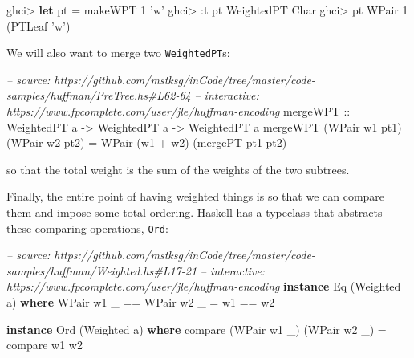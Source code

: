\documentclass[]{article}
\newenvironment{Shaded}{}{}
\newcommand{\KeywordTok}[1]{\textcolor[rgb]{0.00,0.44,0.13}{\textbf{{#1}}}}
\newcommand{\DataTypeTok}[1]{\textcolor[rgb]{0.56,0.13,0.00}{{#1}}}
\newcommand{\DecValTok}[1]{\textcolor[rgb]{0.25,0.63,0.44}{{#1}}}
\newcommand{\CharTok}[1]{\textcolor[rgb]{0.25,0.44,0.63}{{#1}}}
\newcommand{\CommentTok}[1]{\textcolor[rgb]{0.38,0.63,0.69}{\textit{{#1}}}}
\newcommand{\OtherTok}[1]{\textcolor[rgb]{0.00,0.44,0.13}{{#1}}}
\newcommand{\FunctionTok}[1]{\textcolor[rgb]{0.02,0.16,0.49}{{#1}}}
\newcommand{\NormalTok}[1]{{#1}}
\begin{document}
\begin{Shaded}
\begin{Highlighting}[]
\NormalTok{ghci}\FunctionTok{>} \KeywordTok{let} \NormalTok{pt }\FunctionTok{=} \NormalTok{makeWPT }\DecValTok{1} \CharTok{'w'}
\NormalTok{ghci}\FunctionTok{>} \FunctionTok{:}\NormalTok{t pt}
\DataTypeTok{WeightedPT} \DataTypeTok{Char}
\NormalTok{ghci}\FunctionTok{>} \NormalTok{pt}
\DataTypeTok{WPair} \DecValTok{1} \NormalTok{(}\DataTypeTok{PTLeaf} \CharTok{'w'}\NormalTok{)}
\end{Highlighting}
\end{Shaded}

We will also want to merge two \texttt{WeightedPT}s:

\begin{Shaded}
\begin{Highlighting}[]
\CommentTok{-- source: https://github.com/mstksg/inCode/tree/master/code-samples/huffman/PreTree.hs#L62-64}
\CommentTok{-- interactive: https://www.fpcomplete.com/user/jle/huffman-encoding}
\OtherTok{mergeWPT ::} \DataTypeTok{WeightedPT} \NormalTok{a }\OtherTok{->} \DataTypeTok{WeightedPT} \NormalTok{a }\OtherTok{->} \DataTypeTok{WeightedPT} \NormalTok{a}
\NormalTok{mergeWPT (}\DataTypeTok{WPair} \NormalTok{w1 pt1) (}\DataTypeTok{WPair} \NormalTok{w2 pt2)}
    \FunctionTok{=} \DataTypeTok{WPair} \NormalTok{(w1 }\FunctionTok{+} \NormalTok{w2) (mergePT pt1 pt2)}
\end{Highlighting}
\end{Shaded}

so that the total weight is the sum of the weights of the two subtrees.

Finally, the entire point of having weighted things is so that we can
compare them and impose some total ordering. Haskell has a typeclass
that abstracts these comparing operations, \texttt{Ord}:

\begin{Shaded}
\begin{Highlighting}[]
\CommentTok{-- source: https://github.com/mstksg/inCode/tree/master/code-samples/huffman/Weighted.hs#L17-21}
\CommentTok{-- interactive: https://www.fpcomplete.com/user/jle/huffman-encoding}
\KeywordTok{instance} \DataTypeTok{Eq} \NormalTok{(}\DataTypeTok{Weighted} \NormalTok{a) }\KeywordTok{where}
    \DataTypeTok{WPair} \NormalTok{w1 _ }\FunctionTok{==} \DataTypeTok{WPair} \NormalTok{w2 _ }\FunctionTok{=} \NormalTok{w1 }\FunctionTok{==} \NormalTok{w2}

\KeywordTok{instance} \DataTypeTok{Ord} \NormalTok{(}\DataTypeTok{Weighted} \NormalTok{a) }\KeywordTok{where}
    \NormalTok{compare (}\DataTypeTok{WPair} \NormalTok{w1 _) (}\DataTypeTok{WPair} \NormalTok{w2 _) }\FunctionTok{=} \NormalTok{compare w1 w2}
\end{Highlighting}
\end{Shaded}
\end{document}
